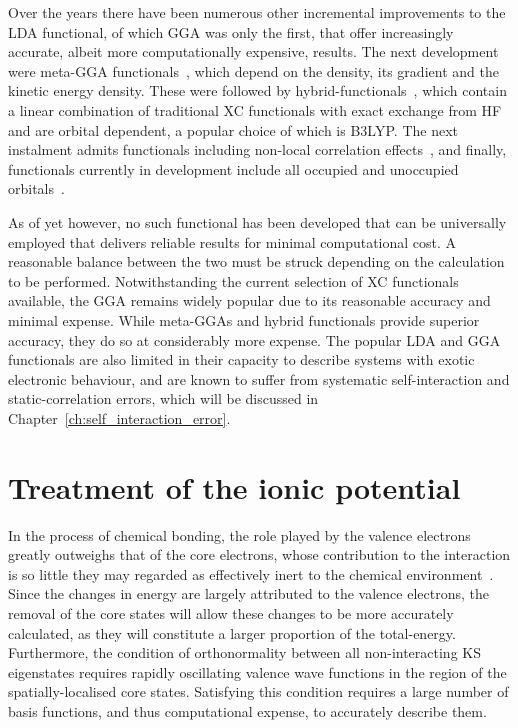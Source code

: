 Over the years there have been numerous other 
incremental improvements to the LDA functional, 
of which GGA was only the first, 
that offer increasingly accurate, 
albeit more computationally expensive, 
results.
%
The next development   
were meta-GGA functionals~\cite{PhysRevLett.91.146401}, 
which depend on the density, its gradient 
and the kinetic energy density.
%
These were followed by 
hybrid-functionals~\cite{doi:10.1063/1.464304},  
which contain a linear combination of 
traditional XC functionals with exact exchange from HF 
and are orbital dependent, 
a popular choice of which is B3LYP.
%
{The next instalment} 
admits functionals including non-local correlation effects~\cite{B608478H}, 
and finally,  
functionals currently in development include all 
occupied and unoccupied 
orbitals~\cite{JCC:JCC23391}.

%
As of yet however, 
no such functional has been developed 
that can be universally employed 
that delivers reliable results 
for minimal computational cost. 
%
A reasonable balance 
between the two must be struck 
depending on the calculation to be performed.
%
Notwithstanding the current 
selection %
of XC functionals available, 
{the GGA remains widely popular 
due to its reasonable accuracy 
and minimal expense.
% 
While meta-GGAs and hybrid functionals 
provide superior accuracy, 
they do so at considerably more expense}.
%
The popular LDA and GGA functionals 
are also limited in their capacity to describe 
systems with exotic electronic behaviour, 
and are known to suffer from systematic  
self-interaction and static-correlation errors, 
which will be discussed in Chapter~\ref{ch:self_interaction_error}.


\section{Treatment of the ionic potential}
\label{sec:ion_cores}

In the process of chemical bonding, 
the role played by the valence electrons 
greatly outweighs that of the core electrons,  
whose contribution to the interaction is so little 
they may regarded as effectively inert 
to the chemical environment~\cite{RASSOLOV2001573}.
%
{
Since the changes in energy are 
largely attributed to the valence electrons, 
the removal of the core states 
will allow these changes to 
be more accurately calculated, 
as they will constitute a 
larger proportion of the total-energy.} 
%
{
Furthermore, 
the condition of orthonormality  
between all non-interacting KS eigenstates 
requires rapidly oscillating 
valence wave functions 
in the region of the spatially-localised core states.}
% 
Satisfying this condition requires 
a large number of basis functions, 
and thus computational expense, 
to accurately describe them.

